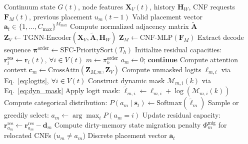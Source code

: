 \documentclass[conference]{IEEEtran}
\begin{document}
\begin{algorithm}[t]
\caption{TGNN-NCO Autoregressive Placement}
\label{alg:tgnn_nco}
\begin{algorithmic}[1]
\REQUIRE Continuum state $G(t)$, node features $\mathbf{X}_V(t)$, history $\mathbf{H}_W$, CNF requests $\mathbf{F}_M(t)$, previous placement $u_m(t-1)$
\ENSURE Valid placement vector $\mathbf{a}_t \in \{1, \dots, C_{\max}\}^{M_{\max}}$
\STATE Compute normalized adjacency matrix $\tilde{\mathbf{A}}$
\STATE $\mathbf{Z}_V \leftarrow \text{TGNN-Encoder}(\mathbf{X}_V, \tilde{\mathbf{A}}, \mathbf{H}_W)$
\STATE $\mathbf{Z}_M \leftarrow \text{CNF-MLP}(\mathbf{F}_M)$
\STATE Extract decode sequence $\boldsymbol{\pi}^{\text{order}} \leftarrow \text{SFC-PrioritySort}(T_h)$
\STATE Initialize residual capacities: $\mathbf{r}_i^{\text{res}} \leftarrow \mathbf{r}_i(t), \, \forall i \in V(t)$
    \STATE $m \leftarrow \pi_k^{\text{order}}$
        \STATE $a_m \leftarrow 0$; \textbf{continue}
    \ENDIF
    \STATE Compute attention context $\mathbf{c}_m \leftarrow \text{CrossAttn}(\mathbf{Z}_{M, m}, \mathbf{Z}_V)$
    \STATE Compute unmasked logits $\ell_{m, i}$ via Eq.~\eqref{eq:logits}, $\forall i \in V(t)$
    \STATE Construct dynamic mask $\mathcal{M}_{m, i}(k)$ via Eq.~\eqref{eq:dyn_mask}
    \STATE Apply logit mask: $\tilde{\ell}_{m, i} \leftarrow \ell_{m, i} + \log(\mathcal{M}_{m, i}(k))$
    \STATE Compute categorical distribution: $P(a_m \mid \mathbf{s}_t) \leftarrow \text{Softmax}(\tilde{\boldsymbol{\ell}}_m)$
    \STATE Sample or greedily select: $a_m \leftarrow \arg\max_i P(a_m = i)$
    \STATE Update residual capacity: $\mathbf{r}_{a_m}^{\text{res}} \leftarrow \mathbf{r}_{a_m}^{\text{res}} - \mathbf{d}_m$
\ENDFOR
\STATE Compute dirty-memory state migration penalty $\Phi_m^{\text{mig}}$ for relocated CNFs ($u_m \ne a_m$)
\RETURN Discrete placement vector $\mathbf{a}_t$
\end{algorithmic}
\end{algorithm}

\end{document}
